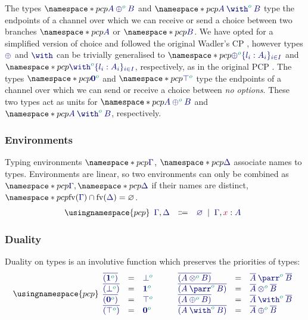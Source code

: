 \documentclass[main.tex]{subfiles}
\begin{document}
The types $\pcp{\ty{\typlus[\cs{o}]{A}{B}}}$ and $\pcp{\ty{\tywith[\cs{o}]{A}{B}}}$ type the endpoints of a channel over which we can receive or send a choice between two branches $\pcp{\ty{A}}$ or $\pcp{\ty{B}}$. We have opted for a simplified version of choice and followed the original Wadler's CP \cite{wadler12}, however types $\ty{\oplus}$ and $\ty{\with}$ can be trivially generalised to $\pcp{\ty{\oplus^{\cs{o}}\{l_i:A_i\}_{i\in I}}}$ and $\pcp{\ty{\with^{\cs{o}}\{l_i:A_i\}_{i\in I}}}$, respectively, as in the original PCP \cite{dardhagay18}.
The types $\pcp{\ty{\tynil[\cs{o}]}}$ and $\pcp{\ty{\tytop[\cs{o}]}}$ type the endpoints of a channel over which we can send or receive a choice between \emph{no options}. These two types act as units for $\pcp{\ty{\typlus[\cs{o}]{A}{B}}}$ and $\pcp{\ty{\tywith[\cs{o}]{A}{B}}}$, respectively.

\subsubsection*{Environments}
Typing environments $\pcp{\ty{\Gamma}}$, $\pcp{\ty{\Delta}}$ associate names to types. Environments are linear, so two environments can only be combined as $\pcp{\ty{\Gamma}}, \pcp{\ty{\Delta}}$ if their names are distinct, \ie $\pcp{\fv(\ty{\Gamma})\cap\fv(\ty{\Delta})=\varnothing}$.
\[
  \usingnamespace{pcp}
  \begin{array}{lcl}
    \ty{\Gamma}, \ty{\Delta}
    & \Coloneqq & \ty{\emptyenv}
      \sep        \ty{\Gamma}, \tmty{x}{A}
  \end{array}
\]

\subsubsection*{Duality}
Duality on types is an involutive function which preserves the priorities of types:
\[
  \usingnamespace{pcp}
  \begin{array}{lcl}
    \ty{\co{(\tyone[\cs{o}])}} & = & \ty{\tybot[\cs{o}]} \\
    \ty{\co{(\tybot[\cs{o}])}} & = & \ty{\tyone[\cs{o}]} \\
    \ty{\co{(\tynil[\cs{o}])}} & = & \ty{\tytop[\cs{o}]} \\
    \ty{\co{(\tytop[\cs{o}])}} & = & \ty{\tynil[\cs{o}]}
  \end{array}
  \qquad
  \begin{array}{lcl}
    \ty{\co{(\tytens[\cs{o}]{A}{B})}} & = & \ty{\typarr[\cs{o}]{\co{A}}{\co{B}}} \\
    \ty{\co{(\typarr[\cs{o}]{A}{B})}} & = & \ty{\tytens[\cs{o}]{\co{A}}{\co{B}}} \\
    \ty{\co{(\typlus[\cs{o}]{A}{B})}} & = & \ty{\tywith[\cs{o}]{\co{A}}{\co{B}}} \\
    \ty{\co{(\tywith[\cs{o}]{A}{B})}} & = & \ty{\typlus[\cs{o}]{\co{A}}{\co{B}}}
  \end{array}
\]
\end{document}
